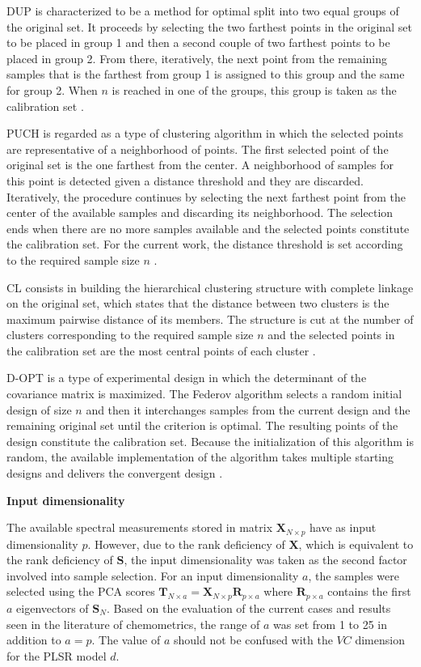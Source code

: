 \documentclass[journal=ancham,manuscript=article]{achemso}
\begin{document}
DUP is characterized to be a method for optimal split into two equal groups of the original set. It proceeds by selecting the two farthest points in the original set to be placed in group 1 and then a second couple of two farthest points to be placed in group 2. From there, iteratively, the next point from the remaining samples that is the farthest from group 1 is assigned to this group and the same for group 2. When $n$ is reached in one of the groups, this group is taken as the calibration set \cite{Snee1977}.

PUCH is regarded as a type of clustering algorithm in which the selected points are representative of a neighborhood of points. The first selected point of the original set is the one farthest from the center. A neighborhood of samples for this point is detected given a distance threshold and they are discarded. Iteratively, the procedure continues by selecting the next farthest point from the center of the available samples and discarding its neighborhood. The selection ends when there are no more samples available and the selected points constitute the calibration set. For the current work, the distance threshold is set according to the required sample size $n$ \cite{Puchwein1988}.

CL consists in building the hierarchical clustering structure with complete linkage on the original set, which states that the distance between two clusters is the maximum pairwise distance of its members. The structure is cut at the number of clusters corresponding to the required sample size $n$ and the selected points in the calibration set are the most central points of each cluster \cite{Naes1990}.

D-OPT is a type of experimental design in which the determinant of the covariance matrix is maximized. The Federov algorithm selects a random initial design of size $n$ and then it interchanges samples from the current design and the remaining original set until the criterion is optimal. The resulting points of the design constitute the calibration set. Because the initialization of this algorithm is random, the available implementation of the algorithm takes multiple starting designs and delivers the convergent design \cite{Wheeler2019}.


\textbf{Input dimensionality}

The available spectral measurements stored in matrix $\mathbf{X}_{N\times p}$ have as input dimensionality $p$. However, due to the rank deficiency of $\mathbf{X}$, which is equivalent to the rank deficiency of $\mathbf{S}$, the input dimensionality was taken as the second factor involved into sample selection. For an input dimensionality $a$, the samples were selected using the PCA scores $\mathbf{T}_{N\times a} = \mathbf{X}_{N\times p}\mathbf{R}_{p\times a}$ where $\mathbf{R}_{p\times a}$ contains the first $a$ eigenvectors of $\mathbf{S}_N$. Based on the evaluation of the current cases and results seen in the literature of chemometrics, the range of $a$ was set from 1 to 25 in addition to $a=p$. The value of $a$ should not be confused with the $VC$ dimension for the PLSR model $d$. 
\end{document}
